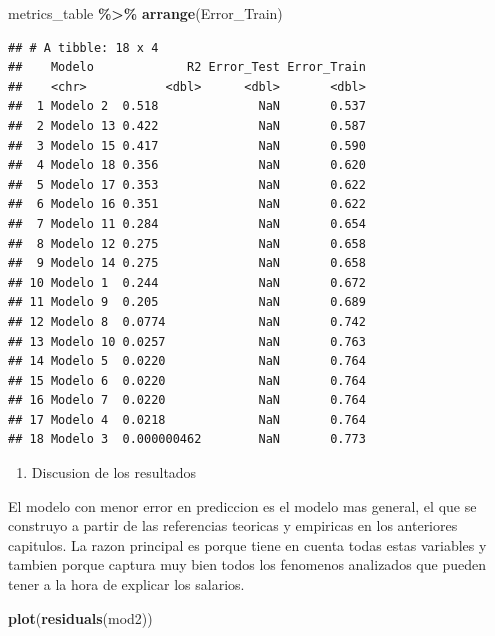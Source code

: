 \documentclass[
]{article}
\newenvironment{Shaded}{\begin{snugshade}}{\end{snugshade}}
\newcommand{\FunctionTok}[1]{\textcolor[rgb]{0.13,0.29,0.53}{\textbf{#1}}}
\newcommand{\NormalTok}[1]{#1}
\newcommand{\SpecialCharTok}[1]{\textcolor[rgb]{0.81,0.36,0.00}{\textbf{#1}}}
\providecommand{\tightlist}{%
  \setlength{\itemsep}{0pt}\setlength{\parskip}{0pt}}
\begin{document}
\begin{Shaded}
\begin{Highlighting}[]
\NormalTok{metrics\_table }\SpecialCharTok{\%\textgreater{}\%} \FunctionTok{arrange}\NormalTok{(Error\_Train)}
\end{Highlighting}
\end{Shaded}

\begin{verbatim}
## # A tibble: 18 x 4
##    Modelo             R2 Error_Test Error_Train
##    <chr>           <dbl>      <dbl>       <dbl>
##  1 Modelo 2  0.518              NaN       0.537
##  2 Modelo 13 0.422              NaN       0.587
##  3 Modelo 15 0.417              NaN       0.590
##  4 Modelo 18 0.356              NaN       0.620
##  5 Modelo 17 0.353              NaN       0.622
##  6 Modelo 16 0.351              NaN       0.622
##  7 Modelo 11 0.284              NaN       0.654
##  8 Modelo 12 0.275              NaN       0.658
##  9 Modelo 14 0.275              NaN       0.658
## 10 Modelo 1  0.244              NaN       0.672
## 11 Modelo 9  0.205              NaN       0.689
## 12 Modelo 8  0.0774             NaN       0.742
## 13 Modelo 10 0.0257             NaN       0.763
## 14 Modelo 5  0.0220             NaN       0.764
## 15 Modelo 6  0.0220             NaN       0.764
## 16 Modelo 7  0.0220             NaN       0.764
## 17 Modelo 4  0.0218             NaN       0.764
## 18 Modelo 3  0.000000462        NaN       0.773
\end{verbatim}

\begin{enumerate}
\def\labelenumi{\alph{enumi})}
\setcounter{enumi}{2}
\tightlist
\item
  Discusion de los resultados
\end{enumerate}

El modelo con menor error en prediccion es el modelo mas general, el que
se construyo a partir de las referencias teoricas y empiricas en los
anteriores capitulos. La razon principal es porque tiene en cuenta todas
estas variables y tambien porque captura muy bien todos los fenomenos
analizados que pueden tener a la hora de explicar los salarios.

\begin{Shaded}
\begin{Highlighting}[]
\FunctionTok{plot}\NormalTok{(}\FunctionTok{residuals}\NormalTok{(mod2))}
\end{Highlighting}
\end{Shaded}
\end{document}
